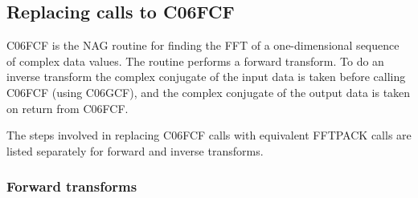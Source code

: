 \documentclass[11pt,twoside]{article}
\newcommand{\xlabel}[1]{}
\begin{document}

\subsection{\xlabel{replacing_calls_to_c06fcf}Replacing calls to C06FCF}

   C06FCF is the NAG routine for finding the FFT of a one-dimensional
   sequence of complex data values. The routine performs a forward
   transform. To do an inverse transform the complex conjugate of the
   input data is taken before calling C06FCF (using C06GCF), and the
   complex conjugate of the output data is taken on return from C06FCF.

   The steps involved in replacing C06FCF calls with
   equivalent FFTPACK calls are listed separately for forward and
   inverse transforms.


\subsubsection{\xlabel{forward_transforms}Forward transforms}
\end{document}
